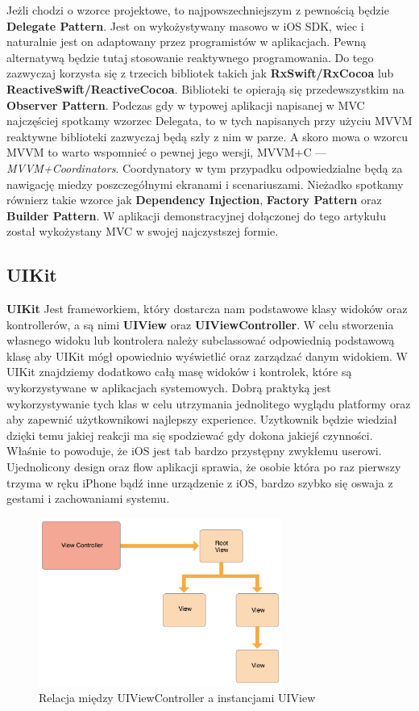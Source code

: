 \documentclass{article}
\begin{document}
Jeżli chodzi o wzorce projektowe, to najpowszechniejszym z pewnością będzie 
\textbf{Delegate Pattern}. Jest on wykożystywany masowo w iOS SDK, wiec i naturalnie
jest on adaptowany przez programistów w aplikacjach. Pewną alternatywą będzie tutaj 
stosowanie reaktywnego programowania. Do tego zazwyczaj korzysta się z trzecich
bibliotek takich jak \textbf{RxSwift/RxCocoa} lub \textbf{ReactiveSwift/ReactiveCocoa}.
Biblioteki te opierają się przedewszystkim na \textbf{Observer Pattern}. Podczas 
gdy w typowej aplikacji napisanej w MVC najczęściej spotkamy wzorzec Delegata,
to w tych napisanych przy użyciu MVVM reaktywne biblioteki zazwyczaj będą szły 
z nim w parze. A skoro mowa o wzorcu MVVM to warto wspomnieć o pewnej jego wersji,
MVVM+C --- \textit{MVVM+Coordinators}. Coordynatory w tym przypadku odpowiedzialne
będą za nawigację miedzy poszczegółnymi ekranami i scenariuszami. Nieżadko spotkamy 
równierz takie wzorce jak \textbf{Dependency Injection}, \textbf{Factory Pattern}
oraz \textbf{Builder Pattern}. W aplikacji demonstracyjnej dołączonej do tego artykułu
został wykożystany MVC w swojej najczystszej formie.

\subsection*{UIKit}
\textbf{UIKit} Jest frameworkiem, który dostarcza nam podstawowe klasy widoków oraz
kontrollerów, a są nimi \textbf{UIView} oraz \textbf{UIViewController}. W celu 
stworzenia własnego widoku lub kontrolera należy subclassować odpowiednią podstawową
klasę aby UIKit mógł opowiednio wyświetlić oraz zarządzać danym widokiem. W UIKit
znajdziemy dodatkowo całą masę widoków i kontrolek, które są wykorzystywane w
aplikacjach systemowych. Dobrą praktyką jest wykorzystywanie tych klas w celu
utrzymania jednolitego wyglądu platformy oraz aby zapewnić użytkownikowi najlepszy 
experience. Uzytkownik będzie wiedział dzięki temu jakiej reakcji ma się spodziewać
gdy dokona jakiejś czynności. Właśnie to powoduje, że iOS jest tab bardzo przystępny
zwykłemu userowi. Ujednolicony design oraz flow aplikacji sprawia, że osobie która
po raz pierwszy trzyma w ręku iPhone bądź inne urządzenie z iOS, bardzo szybko
się oswaja z gestami i zachowaniami systemu.

\begin{figure}[h]
\centering
\includegraphics[width=8cm]{viewcontroller-relationship}
\caption{Relacja między UIViewController a instancjami UIView}
\end{figure}
\end{document}
